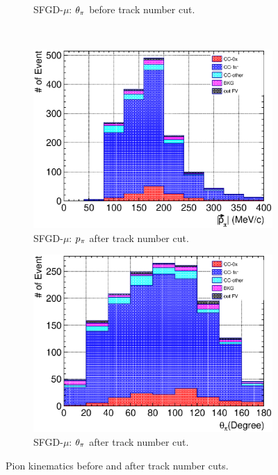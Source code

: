 \begin{figure}
\begin{subfigure}{\dbfigwid\textwidth}
                    \caption{SFGD-$\mu$: $\theta_{\pi}$ before track number cut.}
                    \label{subfig:tlpi-tpi-bf-trknumcut-sfg}
               \end{subfigure}
               \\
               \begin{subfigure}{\dbfigwid\textwidth}
                    \includegraphics[width=\textwidth]{figures/sel/SFGmu_p_pi_stack_al9.eps}
                    \caption{SFGD-$\mu$: $p_{\pi}$ after track number cut.}
                    \label{subfig:tlpi-ppi-af-trknumcut-sfg}
               \end{subfigure}
               \begin{subfigure}{\dbfigwid\textwidth}
                    \includegraphics[width=\textwidth]{figures/sel/SFGmu_theta_pi_stack_al9.eps}
                    \caption{SFGD-$\mu$: $\theta_{\pi}$ after track number cut.}
                    \label{subfig:tlpi-tpi-af-trknumcut-sfg}
               \end{subfigure}
               \caption{Pion kinematics before and after track number cuts.}
               \label{fig:tl-trknum-cut-res}
          \end{figure}


